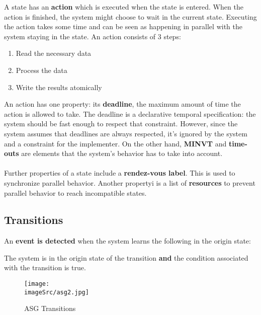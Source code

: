 \documentclass[../main.tex]{subfiles}
\renewcommand{\imageSrc}{../images/}
\begin{document}
A state has an \textbf{action} which is executed when the state is entered. When the action is finished, the system might choose to wait in the current state.  Executing the action takes some time and can be seen as happening in parallel with the system staying in the state. An action consists of 3 steps:
\begin{enumerate}
	\item Read the necessary data
	\item Process the data
	\item Write the results atomically
\end{enumerate}
An action has one property: its \textbf{deadline}, the maximum amount of time the action is allowed to take. The deadline is a declarative temporal specification: the system should be fast enough to respect that constraint. However, since the system assumes that deadlines are always respected, it's ignored by the system and a constraint for the implementer. On the other hand, \textbf{MINVT} and \textbf{time-outs} are elements that the system's behavior has to take into account.
\\\\
Further properties of a state include a \textbf{rendez-vous label}. This is used to synchronize parallel behavior. Another propertyi is a list of \textbf{resources} to prevent parallel behavior to reach incompatible states.

\subsection{Transitions}
\begin{defn}
An \textbf{event is detected} when the system learns the following in the origin state:
\begin{center}
The system is in the origin state of the transition \textbf{and} the condition associated with the transition is true.
\end{center}
\end{defn}

\begin{figure}[H]
    \centering
    \texttt{[image: \\imageSrc/asg2.jpg]}
    \caption{ASG Transitions}
    \label{asg2}
\end{figure}
\end{document}
